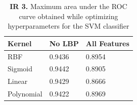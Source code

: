 \documentclass{article}
\begin{document}
\begin{table}[]
\centering
\caption*{\textbf{IR 3. }Maximum area under the ROC curve obtained while optimizing hyperparameters for the SVM classifier}
\label{auc-results}
\begin{tabular}{lll}
\hline
\textbf{Kernel} & \textbf{No LBP} & \textbf{All Features} \\ \hline
RBF             & 0.9436                & 0.8954          \\
Sigmoid         & 0.9442                & 0.8905          \\
Linear          & 0.9429                & 0.8666          \\
Polynomial      & 0.9422                & 0.8969         \\ \hline
\end{tabular}
\end{table}
\end{document}
